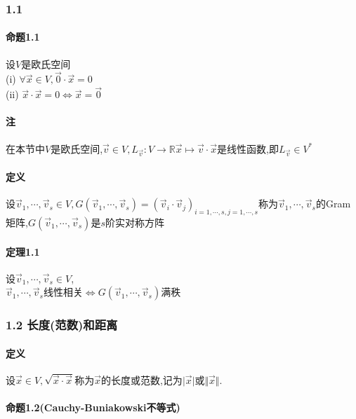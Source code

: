 \documentclass{ctexart}
\begin{document}
\subsubsection{1.1 }

\paragraph{命题1.1}
设$V$是欧氏空间\\
(i) $\forall \vec{x} \in V, \vec{0} \cdot \vec{x} = 0$\\
(ii) $\vec{x}\cdot\vec{x} = 0 \Leftrightarrow \vec{x} = \vec{0}$

\paragraph{注}
在本节中$V$是欧氏空间,$\vec{v} \in V, L_{\vec{v}}:V \rightarrow \mathbb{R} \vec{x} \mapsto \vec{v}\cdot\vec{x}$是线性函数,即$L_{\vec{v}} \in V^{*}$

\paragraph{定义}
设$\vec{v}_{1},\cdots,\vec{v}_{s} \in V,G(\vec{v}_{1},\cdots,\vec{v}_{s})=(\vec{v}_{i}\cdot \vec{v}_{j})_{i=1,\cdots,s,j=1,\cdots,s}$称为$\vec{v}_{1},\cdots,\vec{v}_{s}$的Gram矩阵,$G(\vec{v}_{1},\cdots,\vec{v}_{s})$是$s$阶实对称方阵

\paragraph{定理1.1}
设$\vec{v}_{1},\cdots,\vec{v}_{s} \in V$,\\
$\vec{v}_{1},\cdots,\vec{v}_{s}$线性相关$\Leftrightarrow G(\vec{v}_{1},\cdots,\vec{v}_{s})$满秩

\subsubsection{1.2 长度(范数)和距离}

\paragraph{定义}
设$\vec{x} \in V, \sqrt{\vec{x}\cdot\vec{x}}$称为$\vec{x}$的长度或范数,记为$\vert \vec{x} \vert$或$\Vert \vec{x} \Vert$.

\paragraph{命题1.2(Cauchy-Buniakowski不等式)}
\end{document}

